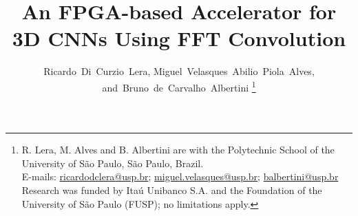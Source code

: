 \documentclass[10pt]{article}
\begin{document}
\title{An FPGA-based Accelerator for 3D CNNs Using FFT Convolution}
\author{
  Ricardo~Di~Curzio~Lera, 
  Miguel~Velasques~Abilio~Piola~Alves,\\
  and~Bruno~de~Carvalho~Albertini%
  \footnote{%
  R. Lera, M. Alves and B. Albertini are with the Polytechnic School of the University of São Paulo, São Paulo, Brazil.\protect\\
  E-mails: \href{mailto:ricardodclera@usp.br}{ricardodclera@usp.br}; \href{mailto:me@somewhere.com}{miguel.velasques@usp.br}; \href{mailto:me@somewhere.com}{balbertini@usp.br}\protect\\
  Research was funded by Itaú Unibanco S.A. and the Foundation of the University of São Paulo (FUSP); no limitations apply.%
}}
\date{}
\maketitle
\end{document}
